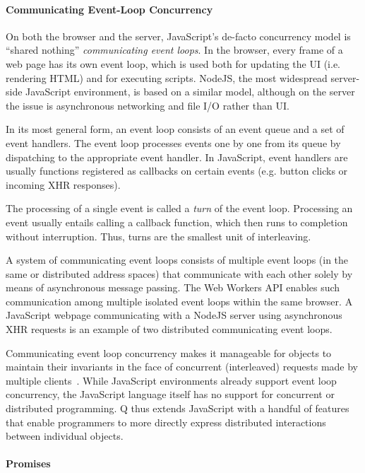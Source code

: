 \documentclass{llncs}
\begin{document}
\paragraph{Communicating Event-Loop Concurrency}

On both the browser and the server, JavaScript's de-facto concurrency model is ``shared nothing'' \emph{communicating event loops}. In the browser, every frame of a web page has its own event loop, which is used both for updating the UI (i.e. rendering HTML) and for executing scripts. NodeJS, the most widespread server-side JavaScript environment, is based on a similar model, although on the server the issue is asynchronous networking and file I/O rather than UI.

In its most general form, an event loop consists of an event queue and a set of event handlers. The event loop processes events one by one from its queue by dispatching to the appropriate event handler. In JavaScript, event handlers are usually functions registered as callbacks on certain events (e.g. button clicks or incoming XHR responses).

The processing of a single event is called a \emph{turn} of the event loop. Processing an event usually entails calling a callback function, which then runs to completion without interruption. Thus, turns are the smallest unit of interleaving.

A system of communicating event loops consists of multiple event loops (in the same or distributed address spaces) that communicate with each other solely by means of asynchronous message passing. The Web Workers API enables such communication among multiple isolated event loops within the same browser. A JavaScript webpage communicating with a NodeJS server using asynchronous XHR requests is an example of two distributed communicating event loops.

Communicating event loop concurrency makes it manageable for objects to maintain their invariants in the face of concurrent (interleaved) requests made by multiple clients~\cite{miller:strangers}. While JavaScript environments already support event loop concurrency, the JavaScript language itself has no support for concurrent or distributed programming. Q thus extends JavaScript with a handful of features that enable programmers to more directly express distributed interactions between individual objects.

\paragraph{Promises}
\end{document}
